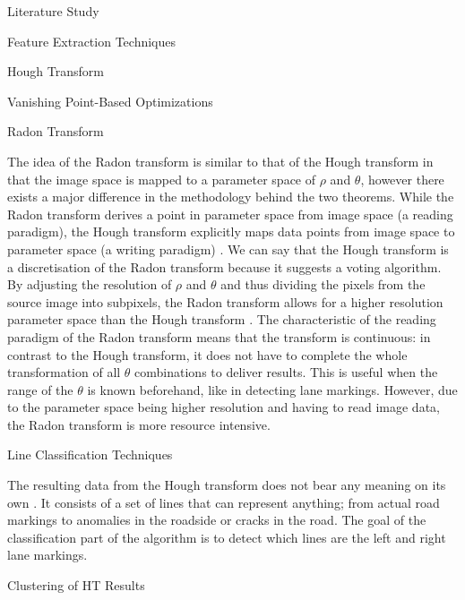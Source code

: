 \documentclass{matthijs}
\begin{document}
\begin{hoofdstuk}{Literature Study}
\begin{paragraaf}{Feature Extraction Techniques}
\begin{subparagraaf}{Hough Transform}
\begin{subsubparagraaf}{Vanishing Point-Based Optimizations}
				\end{subsubparagraaf}

			\end{subparagraaf}

			\begin{subparagraaf}{Radon Transform}

				The idea of the Radon transform is similar to that of the Hough transform in that the image space is mapped to a parameter space of $\rho$ and $\theta$, however there exists a major difference in the methodology behind the two theorems.
				While the Radon transform derives a point in parameter space from image space (a reading paradigm), the Hough transform explicitly maps data points from image space to parameter space (a writing paradigm) \cite{orzechowski2014what} \cite{ginkel2004short}.
				We can say that the Hough transform is a discretisation of the Radon transform because it suggests a voting algorithm.
				By adjusting the resolution of $\rho$ and $\theta$ and thus dividing the pixels from the source image into subpixels, the Radon transform allows for a higher resolution parameter space than the Hough transform \cite{orzechowski2014what}.
				The characteristic of the reading paradigm of the Radon transform means that the transform is continuous: in contrast to the Hough transform, it does not have to complete the whole transformation of all $\theta$ combinations to deliver results.
				This is useful when the range of the $\theta$ is known beforehand, like in detecting lane markings.
				However, due to the parameter space being higher resolution and having to read image data, the Radon transform is more resource intensive.

			\end{subparagraaf}

		\end{paragraaf}

		\begin{paragraaf}{Line Classification Techniques}

			The resulting data from the Hough transform does not bear any meaning on its own \cite{gupta2016automated}.
			It consists of a set of lines that can represent anything; from actual road markings to anomalies in the roadside or cracks in the road.
			The goal of the classification part of the algorithm is to detect which lines are the left and right lane markings.

			\begin{subparagraaf}{Clustering of HT Results}


\end{subparagraaf}
\end{paragraaf}
\end{hoofdstuk}
\end{document}
